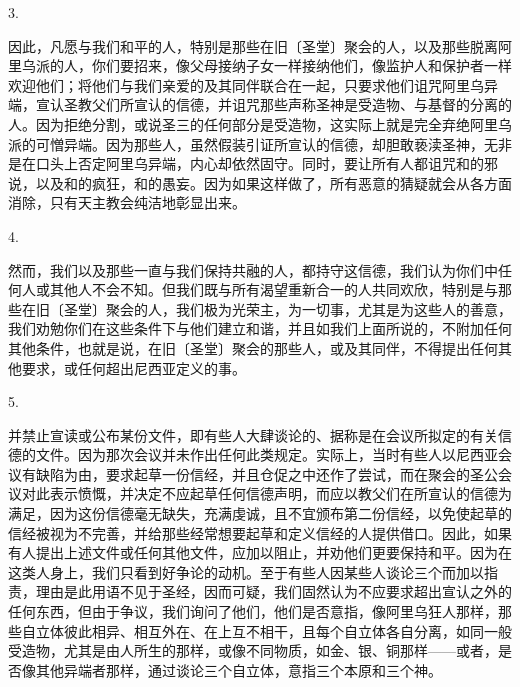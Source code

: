 3. \par

因此，凡愿与我们和平的人，特别是那些在旧〔圣堂〕聚会的人，以及那些脱离阿里乌派的人，你们要招来，像父母接纳子女一样接纳他们，像监护人和保护者一样欢迎他们；将他们与我们亲爱的及其同伴联合在一起，只要求他们诅咒阿里乌异端，宣认圣教父们所宣认的信德，并诅咒那些声称圣神是受造物、与基督的分离的人。因为拒绝分割，或说圣三的任何部分是受造物，这实际上就是完全弃绝阿里乌派的可憎异端。因为那些人，虽然假装引证所宣认的信德，却胆敢亵渎圣神，无非是在口头上否定阿里乌异端，内心却依然固守。同时，要让所有人都诅咒和的邪说，以及和的疯狂，和的愚妄。因为如果这样做了，所有恶意的猜疑就会从各方面消除，只有天主教会纯洁地彰显出来。\par

4. \par

然而，我们以及那些一直与我们保持共融的人，都持守这信德，我们认为你们中任何人或其他人不会不知。但我们既与所有渴望重新合一的人共同欢欣，特别是与那些在旧〔圣堂〕聚会的人，我们极为光荣主，为一切事，尤其是为这些人的善意，我们劝勉你们在这些条件下与他们建立和谐，并且如我们上面所说的，不附加任何其他条件，也就是说，在旧〔圣堂〕聚会的那些人，或及其同伴，不得提出任何其他要求，或任何超出尼西亚定义的事。\par

5. \par

并禁止宣读或公布某份文件，即有些人大肆谈论的、据称是在会议所拟定的有关信德的文件。因为那次会议并未作出任何此类规定。实际上，当时有些人以尼西亚会议有缺陷为由，要求起草一份信经，并且仓促之中还作了尝试，而在聚会的圣公会议对此表示愤慨，并决定不应起草任何信德声明，而应以教父们在所宣认的信德为满足，因为这份信德毫无缺失，充满虔诚，且不宜颁布第二份信经，以免使起草的信经被视为不完善，并给那些经常想要起草和定义信经的人提供借口。因此，如果有人提出上述文件或任何其他文件，应加以阻止，并劝他们更要保持和平。因为在这类人身上，我们只看到好争论的动机。至于有些人因某些人谈论三个而加以指责，理由是此用语不见于圣经，因而可疑，我们固然认为不应要求超出宣认之外的任何东西，但由于争议，我们询问了他们，他们是否意指，像阿里乌狂人那样，那些自立体彼此相异、相互外在、在上互不相干，且每个自立体各自分离，如同一般受造物，尤其是由人所生的那样，或像不同物质，如金、银、铜那样——或者，是否像其他异端者那样，通过谈论三个自立体，意指三个本原和三个神。\par

